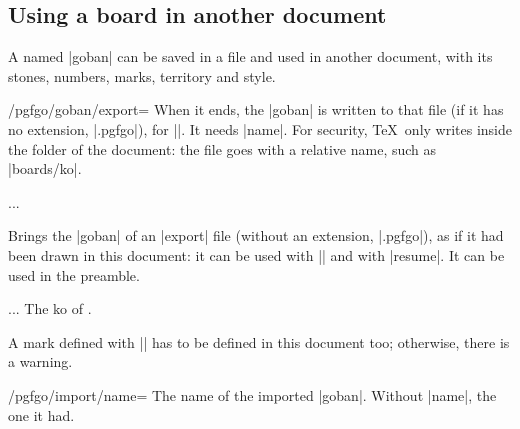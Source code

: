 	\subsection{Using a board in another document}
	\label{subsec:exportar}
	A named |goban| can be saved in a file and used in another document, with its stones, numbers, marks, territory and style.

	\begin{key}{/pgfgo/goban/export=}
		When it ends, the |goban| is written to that file (if it has no extension, |.pgfgo|), for |\pgfgoimport|. It needs |name|. For security, \TeX\ only writes inside the folder of the document: the file goes with a relative name, such as |boards/ko|.

		\begin{codeexample}
			\begin{goban}[19, name = ko, export = ko]
				...
			\end{goban}
		\end{codeexample}
	\end{key}

	\begin{command}{\pgfgoimport{}}
		Brings the |goban| of an |export| file (without an extension, |.pgfgo|), as if it had been drawn in this document: it can be used with |\pgfgoview| and with |resume|. It can be used in the preamble.

		\begin{codeexample}
			...
			The ko of .
			\begin{goban}[resume = {other ko, marks}]
			\end{goban}
		\end{codeexample}

		A mark defined with |\pgfgodefinemark| has to be defined in this document too; otherwise, there is a warning.
	\end{command}

	\begin{key}{/pgfgo/import/name=}
		The name of the imported |goban|. Without |name|, the one it had.
	\end{key}

